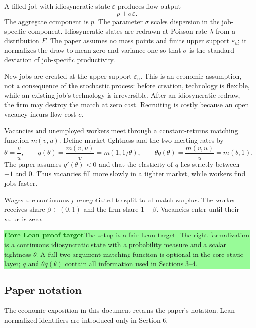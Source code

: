 \documentclass[11pt]{article}
\newcommand{\epsu}{\varepsilon_u}
\newcommand{\core}{\textcolor{darkGreen}{\textbf{Core Lean proof target}}}
\newcommand{\statusbox}[2]{\vspace{2pt}\noindent\colorbox{#1}{\parbox{0.955\linewidth}{\small #2}}\vspace{2pt}}
\begin{document}
A filled job with idiosyncratic state $\varepsilon$ produces flow output
\[
 p+\sigma\varepsilon.
\]
The aggregate component is $p$. The parameter $\sigma$ scales dispersion in the job-specific component. Idiosyncratic states are redrawn at Poisson rate $\lambda$ from a distribution $F$. The paper assumes no mass points and finite upper support $\epsu$; it normalizes the draw to mean zero and variance one so that $\sigma$ is the standard deviation of job-specific productivity.

New jobs are created at the upper support $\epsu$. This is an economic assumption, not a consequence of the stochastic process: before creation, technology is flexible, while an existing job's technology is irreversible. After an idiosyncratic redraw, the firm may destroy the match at zero cost. Recruiting is costly because an open vacancy incurs flow cost $c$.

Vacancies and unemployed workers meet through a constant-returns matching function $m(v,u)$. Define market tightness and the two meeting rates by
\[
 \theta=\frac vu,\qquad q(\theta)=\frac{m(v,u)}{v}=m(1,1/\theta),
 \qquad \theta q(\theta)=\frac{m(v,u)}{u}=m(\theta,1).
\]
The paper assumes $q'(\theta)<0$ and that the elasticity of $q$ lies strictly between $-1$ and $0$. Thus vacancies fill more slowly in a tighter market, while workers find jobs faster.

Wages are continuously renegotiated to split total match surplus. The worker receives share $\beta\in(0,1)$ and the firm share $1-\beta$. Vacancies enter until their value is zero.

\statusbox{paleGreen}{\core\quad The setup is a fair Lean target. The right formalization is a continuous idiosyncratic state with a probability measure and a scalar tightness $\theta$. A full two-argument matching function is optional in the core static layer; $q$ and $\theta q(\theta)$ contain all information used in Sections 3--4.}

\subsection{Paper notation}

The economic exposition in this document retains the paper's notation. Lean-normalized identifiers are introduced only in Section 6.
\end{document}
